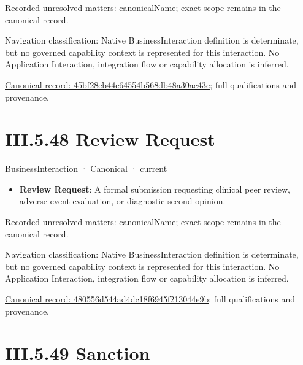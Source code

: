 {\small Recorded unresolved matters: canonicalName; exact scope remains in the canonical record.}\par
{\small Navigation classification: Native BusinessInteraction definition is determinate, but no governed capability context is represented for this interaction. No Application Interaction, integration flow or capability allocation is inferred.}\par
{\footnotesize \href{../../../../../../../continuum/business/business-interaction/45bf28eb44e64554b568db48a30ac43c.md}{Canonical record: 45bf28eb44e64554b568db48a30ac43c}; full qualifications and provenance.}\par
\section*{III.5.48 Review Request}
\label{navigation:III.5.48}

\label{element:480556d544ad4dc18f6945f213044e9b}
{\small BusinessInteraction · Canonical · current}\par

\begin{itemize}


\item \textbf{Review Request}: A formal submission requesting clinical peer review, adverse event evaluation, or diagnostic second opinion.

\end{itemize}

{\small Recorded unresolved matters: canonicalName; exact scope remains in the canonical record.}\par
{\small Navigation classification: Native BusinessInteraction definition is determinate, but no governed capability context is represented for this interaction. No Application Interaction, integration flow or capability allocation is inferred.}\par
{\footnotesize \href{../../../../../../../continuum/business/business-interaction/480556d544ad4dc18f6945f213044e9b.md}{Canonical record: 480556d544ad4dc18f6945f213044e9b}; full qualifications and provenance.}\par
\section*{III.5.49 Sanction}
\label{navigation:III.5.49}

